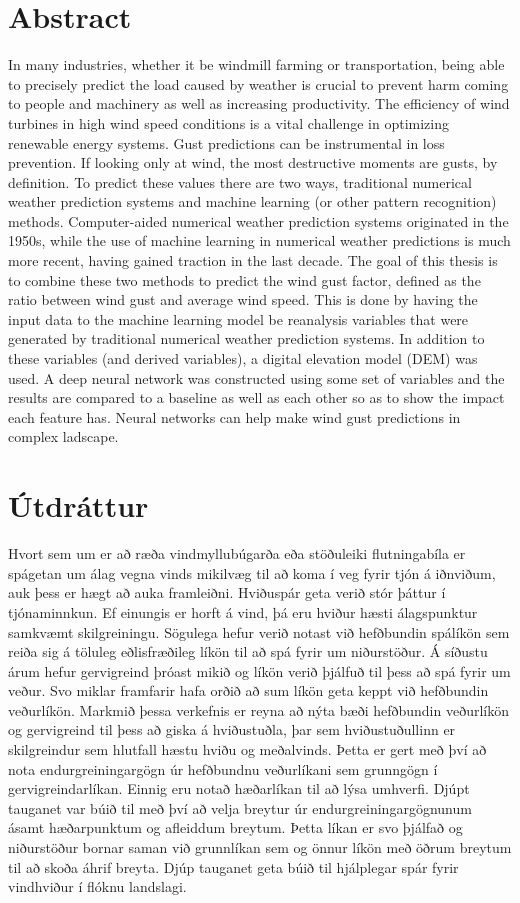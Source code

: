 \documentclass[a4paper,12pt,twoside,BCOR=10mm,openany]{scrbook}
\begin{document}
\section*{Abstract}
In many industries, whether it be windmill farming or transportation, being able to precisely predict the load caused by weather is crucial to prevent harm coming to people and machinery as well as increasing productivity. The efficiency of wind turbines in high wind speed conditions is a vital challenge in optimizing renewable energy systems. Gust predictions can be instrumental in loss prevention. If looking only at wind, the most destructive moments are gusts, by definition. To predict these values there are two ways, traditional numerical weather prediction systems and machine learning (or other pattern recognition) methods. Computer-aided numerical weather prediction systems originated in the 1950s, while the use of machine learning in numerical weather predictions is much more recent, having gained traction in the last decade. The goal of this thesis is to combine these two methods to predict the wind gust factor, defined as the ratio between wind gust and average wind speed. This is done by having the input data to the machine learning model be reanalysis variables that were generated by traditional numerical weather prediction systems. In addition to these variables (and derived variables), a digital elevation model (DEM) was used. A deep neural network was constructed using some set of variables and the results are compared to a baseline as well as each other so as to show the impact each feature has. Neural networks can help make wind gust predictions in complex ladscape.
\vfill \vspace*{1cm}

\section*{Útdráttur}
Hvort sem um er að ræða vindmyllubúgarða eða stöðuleiki flutningabíla er spágetan um álag vegna vinds mikilvæg til að koma í veg fyrir tjón á iðnviðum, auk þess er hægt að auka framleiðni. Hviðuspár geta verið stór þáttur í tjónaminnkun. Ef einungis er horft á vind, þá eru hviður hæsti álagspunktur samkvæmt skilgreiningu. Sögulega hefur verið notast við hefðbundin spálíkön sem reiða sig á töluleg eðlisfræðileg líkön til að spá fyrir um niðurstöður. Á síðustu árum hefur gervigreind þróast mikið og líkön verið þjálfuð til þess að spá fyrir um veður. Svo miklar framfarir hafa orðið að sum líkön geta keppt við hefðbundin veðurlíkön. Markmið þessa verkefnis er reyna að nýta bæði hefðbundin veðurlíkön og gervigreind til þess að giska á hviðustuðla, þar sem hviðustuðullinn er skilgreindur sem hlutfall hæstu hviðu og meðalvinds. Þetta er gert með því að nota endurgreiningargögn úr hefðbundnu veðurlíkani sem grunngögn í gervigreindarlíkan. Einnig eru notað hæðarlíkan til að lýsa umhverfi. Djúpt tauganet var búið til með því að velja breytur úr endurgreiningargögnunum ásamt hæðarpunktum og afleiddum breytum. Þetta líkan er svo þjálfað og niðurstöður bornar saman við grunnlíkan sem og önnur líkön með öðrum breytum til að skoða áhrif breyta. Djúp tauganet geta búið til hjálplegar spár fyrir vindhviður í flóknu landslagi.
\vfill
\end{document}
